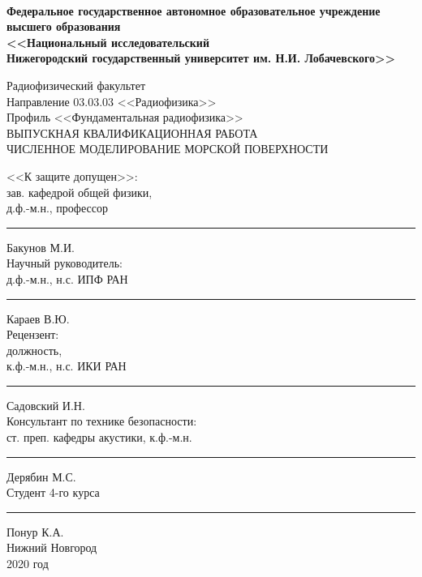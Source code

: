 \documentclass[a4paper,14pt]{extarticle}
\begin{document}
\begin{titlepage}
\begin{spacing}{1}
	\fontsize{11pt}{11pt} \selectfont
	{\centering
	\linespread{1}
	\\[13pt]
	\begin{spacing}{1.5}
		{\fontsize{12pt}{12pt} \selectfont\bf  Федеральное государственное автономное образовательное учреждение \\[-0.27em]
		высшего образования \\[-0.3em]
		<<Национальный исследовательский \\[-0.72em] Нижегородский
		государственный университет им. Н.И. Лобачевского>>
		}\\[4.5pt] 
	\end{spacing}
	\fontsize{12pt}{12pt} \selectfont
	Радиофизический факультет\\[16pt]
	Направление 03.03.03 <<Радиофизика>>\\[5pt]
	Профиль <<Фундаментальная радиофизика>>\\
	\vspace{30pt}
	ВЫПУСКНАЯ КВАЛИФИКАЦИОННАЯ РАБОТА\\
	\vspace{34pt}
	{{
            ЧИСЛЕННОЕ МОДЕЛИРОВАНИЕ МОРСКОЙ ПОВЕРХНОСТИ
	}}\\
	\vspace{34pt}}\fontsize{12pt}{12pt} \selectfont
	\noindent <<К защите допущен>>:\\[15pt]
	зав. кафедрой общей физики,\\[0.4em]
	д.ф.-м.н., профессор\hfill \rule{2cm}{1pt} Бакунов М.И. \hphantom{a\!a}\\[15pt]
	Научный руководитель:\\[0.4em]
	д.ф.-м.н., н.с. ИПФ РАН\hfill \rule{2cm}{1pt} Караев В.Ю. \hphantom{aa\!a}\\[15pt]
	Рецензент:\\[0.4em]
	должность,\\[0.4em] к.ф.-м.н., н.с. ИКИ РАН\hfill \rule{2cm}{1pt}
    Садовский И.Н.\hphantom{\,\,}\\[30pt]
	Консультант по технике безопасности:\\[0.4em]
	ст. преп. кафедры акустики, к.ф.-м.н.\hfill \rule{2cm}{1pt} Дерябин М.С.\hphantom{aa,}\\[15pt]
	Студент 4-го курса \hfill \rule{2cm}{1pt} Понур К.А.
    \hphantom{\,\,\,aaa}\\[15pt]
	\vfill
	\centering
	Нижний Новгород\\[0.4em]
	2020 год
\end{spacing}

\end{titlepage}
\clearpage
\restoregeometry
\end{document}
